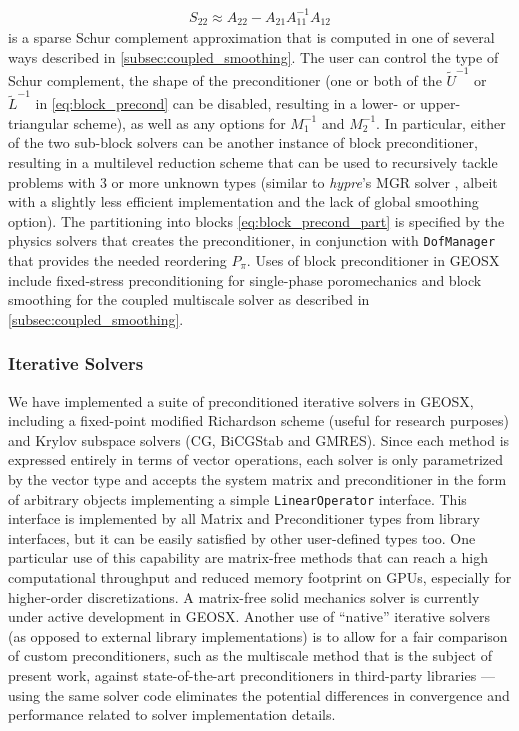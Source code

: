 \begin{align}
    S_{22} \approx A_{22} - A_{21} A_{11}^{-1} A_{12}
\end{align}
is a sparse Schur complement approximation that is computed in one of several ways described in \cref{subsec:coupled_smoothing}.   The user can control the type of Schur complement, the shape of the preconditioner (one or both of the $\widetilde{U}^{-1}$ or $\widetilde{L}^{-1}$ in \cref{eq:block_precond} can be disabled, resulting in a lower- or upper-triangular scheme), as well as any options for $M_1^{-1}$ and $M_2^{-1}$.   In particular, either of the two sub-block solvers can be another instance of block preconditioner, resulting in a multilevel reduction scheme that can be used to recursively tackle problems with 3 or more unknown types (similar to \textit{hypre}'s MGR solver \cite{Bui2020}, albeit with a slightly less efficient implementation and the lack of global smoothing option).   The partitioning into blocks \cref{eq:block_precond_part} is specified by the physics solvers that creates the preconditioner, in conjunction with \texttt{DofManager} that provides the needed reordering $P_\pi$.   Uses of block preconditioner in GEOSX include fixed-stress preconditioning for single-phase poromechanics \cite{White2015} and block smoothing for the coupled multiscale solver as described in \cref{subsec:coupled_smoothing}.

\subsubsection{Iterative Solvers}

We have implemented a suite of preconditioned iterative solvers in GEOSX, including a fixed-point modified Richardson scheme (useful for research purposes) and Krylov subspace solvers (CG, BiCGStab and GMRES).   Since each method is expressed entirely in terms of vector operations, each solver is only parametrized by the vector type and accepts the system matrix and preconditioner in the form of arbitrary objects implementing a simple \texttt{LinearOperator} interface.   This interface is implemented by all Matrix and Preconditioner types from library interfaces, but it can be easily satisfied by other user-defined types too.   One particular use of this capability are matrix-free methods that can reach a high computational throughput and reduced memory footprint on GPUs, especially for higher-order discretizations.   A matrix-free solid mechanics solver is currently under active development in GEOSX.   Another use of ``native'' iterative solvers (as opposed to external library implementations) is to allow for a fair comparison of custom preconditioners, such as the multiscale method that is the subject of present work, against state-of-the-art preconditioners in third-party libraries --- using the same solver code eliminates the potential differences in convergence and performance related to solver implementation details.

